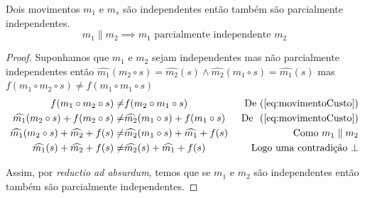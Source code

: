 \begin{theorem}%
Dois movimentos $m_1$ e $m_s$ são independentes então também são parcialmente independentes.
\begin{equation}
m_1 \parallel m_2 \implies m_1 \textrm{ parcialmente independente } m_2
\end{equation}

\begin{proof}
    Suponhamos que $m_1$ e $m_2$ sejam independentes mas não parcialmente independentes então $\widehat{m_1}(m_2 \circ s) = \widehat{m_2}(s) \land \widehat{m_2}(m_1 \circ s) = \widehat{m_1}(s)$ mas $f(m_1 \circ m_2 \circ s) \neq f(m_1 \circ m_1 \circ s)$
    \begin{align*}
        f(m_1 \circ m_2 \circ s) \neq & f(m_2 \circ m_1 \circ s) & \textrm{ De }(\ref{eq:movimentoCusto}) \\
        \widehat{m_1}(m_2 \circ s) + f(m_2 \circ s) \neq & \widehat{m_2}(m_1 \circ s) + f(m_1 \circ s) & \textrm{ De }\ (\ref{eq:movimentoCusto}) \\
        \widehat{m_1}(m_2 \circ s) + \widehat{m_2} + f(s) \neq & \widehat{m_2}(m_1 \circ s) + \widehat{m_1} + f(s) & \textrm{ Como } m_1 \parallel m_2 \\
        \widehat{m_1}(s) + \widehat{m_2} + f(s) \neq & \widehat{m_2}(s) + \widehat{m_1} + f(s) & \textrm{ Logo uma contradição } \bot
    \end{align*}
    
    Assim, por \textit{reductio ad absurdum}, temos que se $m_1$ e $m_2$ são independentes então também são parcialmente independentes.
\end{proof}
\end{theorem}


